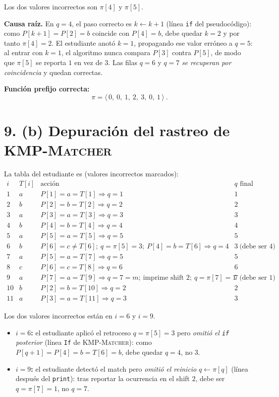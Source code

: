 \documentclass[11pt]{article}
\begin{document}
Los dos valores incorrectos son \(\pi[4]\) y \(\pi[5]\).

\smallskip
\noindent\textbf{Causa raíz.} En \(q=4\), el paso correcto es \(k \gets k+1\) (línea \texttt{if} del pseudocódigo): como \(P[k{+}1]=P[2]{=}b\) coincide con \(P[4]{=}b\), debe quedar \(k=2\) y por tanto \(\pi[4]=2\). El estudiante anotó \(k=1\), propagando ese valor erróneo a \(q=5\): al entrar con \(k=1\), el algoritmo nunca compara \(P[3]\) contra \(P[5]\), de modo que \(\pi[5]\) se reporta \(1\) en vez de \(3\). Las filas \(q=6\) y \(q=7\) \emph{se recuperan por coincidencia} y quedan correctas.

\smallskip
\noindent\textbf{Función prefijo correcta:}
\[
\boxed{\ \pi = \langle\,0,\ 0,\ 1,\ 2,\ 3,\ 0,\ 1\,\rangle\ }.
\]

\section*{9. (b) Depuración del rastreo de \textsc{KMP-Matcher}}

La tabla del estudiante es (valores incorrectos marcados):
\[
\begin{array}{c|c|c|c}
i & T[i] & \text{acción} & q \text{ final reportado}\\\hline
1 & a & P[1]{=}a = T[1] \Rightarrow q=1 & 1\\
2 & b & P[2]{=}b = T[2] \Rightarrow q=2 & 2\\
3 & a & P[3]{=}a = T[3] \Rightarrow q=3 & 3\\
4 & b & P[4]{=}b = T[4] \Rightarrow q=4 & 4\\
5 & a & P[5]{=}a = T[5] \Rightarrow q=5 & 5\\
6 & b & P[6]{=}c \neq T[6];\ q=\pi[5]=3;\ P[4]{=}b = T[6] \Rightarrow q=4 & \boxed{3}\ \text{(debe ser } 4\text{)}\\
7 & a & P[5]{=}a = T[7] \Rightarrow q=5 & 5\\
8 & c & P[6]{=}c = T[8] \Rightarrow q=6 & 6\\
9 & a & P[7]{=}a = T[9] \Rightarrow q=7=m;\ \text{imprime shift } 2;\ q=\pi[7]=1 & \boxed{7}\ \text{(debe ser } 1\text{)}\\
10 & b & P[2]{=}b = T[10] \Rightarrow q=2 & 2\\
11 & a & P[3]{=}a = T[11] \Rightarrow q=3 & 3
\end{array}
\]

Los dos valores incorrectos están en \(i=6\) y \(i=9\).

\begin{itemize}[itemsep=0.15em]
  \item \textbf{\(i=6\):} el estudiante aplicó el retroceso \(q=\pi[5]=3\) pero \emph{omitió el \texttt{if} posterior} (línea \texttt{If} de \textsc{KMP-Matcher}): como \(P[q{+}1]=P[4]{=}b = T[6]{=}b\), debe quedar \(q=4\), no \(3\).
  \item \textbf{\(i=9\):} el estudiante detectó el match pero \emph{omitió el reinicio} \(q \gets \pi[q]\) (línea después del \texttt{print}): tras reportar la ocurrencia en el shift \(2\), debe ser \(q=\pi[7]=1\), no \(q=7\).
\end{itemize}
\end{document}
